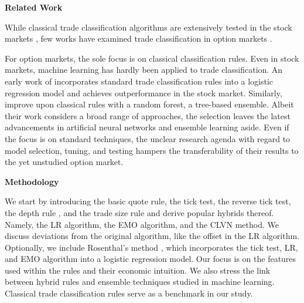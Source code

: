 \textbf{Related Work}

While classical trade classification algorithms are extensively tested in the stock markets \autocites[e.~g.,][]{chakrabartyTradeClassificationAlgorithms2012}{odders-whiteOccurrenceConsequencesInaccurate2000}, few works have examined trade classification in option markets \autocites{grauerOptionTradeClassification2022}{savickasInferringDirectionOption2003}.

For option markets, the sole focus is on classical classification rules. Even in stock markets, machine learning has hardly been applied to trade classification. An early work of \textcite{rosenthalModelingTradeDirection2012} incorporates standard trade classification rules into a logistic regression model and achieves outperformance in the stock market. Similarly, \textcites{fedeniaMachineLearningCorporate2021}{ronenMachineLearningTrade2022} improve upon classical rules with a random forest, a tree-based ensemble. Albeit their work considers a broad range of approaches, the selection leaves the latest advancements in artificial neural networks and ensemble learning aside. Even if the focus is on standard techniques, the unclear research agenda with regard to model selection, tuning, and testing hampers the transferability of their results to the yet unstudied option market. 

\textbf{Methodology}

We start by introducing the basic quote rule, the tick test, the reverse tick test, the depth rule \autocite{grauerOptionTradeClassification2022}, and the trade size rule \autocite{grauerOptionTradeClassification2022} and derive popular hybrids thereof. Namely, the LR algorithm, the EMO algorithm, and the  CLVN method. We discuss deviations from the original algorithm, like the offset in the LR algorithm. Optionally, we include Rosenthal's method \autocite{rosenthalModelingTradeDirection2012}, which incorporates the tick test, LR, and EMO algorithm into a logistic regression model. Our focus is on the features used within the rules and their economic intuition. We also stress the link between hybrid rules and ensemble techniques studied in machine learning. Classical trade classification rules serve as a benchmark in our study.

